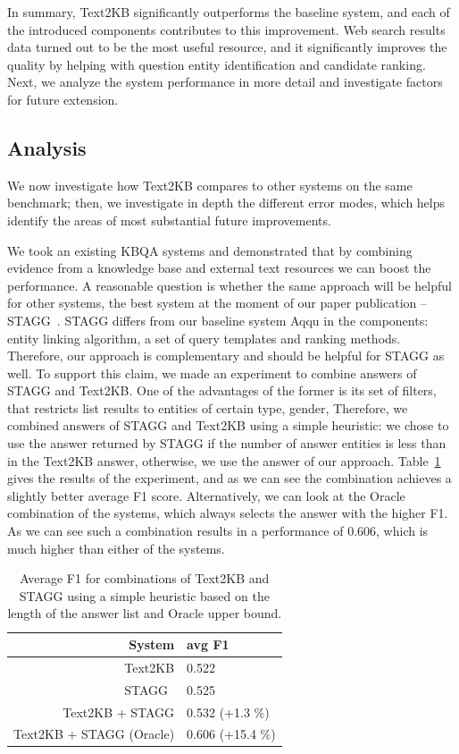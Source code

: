 In summary, Text2KB significantly outperforms the baseline system, and each of the introduced components contributes to this improvement.
Web search results data turned out to be the most useful resource, and it significantly improves the quality by helping with question entity identification and candidate ranking.
Next, we analyze the system performance in more detail and investigate factors for future extension.

\subsection{Analysis}
\label{section:factoid:approaches:text2kb:analysis}

We now investigate how Text2KB compares to other systems on the same benchmark; then, we investigate in depth the different error modes, which helps identify the areas of most substantial future improvements.

We took an existing KBQA systems and demonstrated that by combining evidence from a knowledge base and external text resources we can boost the performance.
A reasonable question is whether the same approach will be helpful for other systems, \eg the best system at the moment of our paper publication -- STAGG~\cite{yih:ACL:2015:STAGG}.
STAGG differs from our baseline system Aqqu in the components: entity linking algorithm, a set of query templates and ranking methods.
Therefore, our approach is complementary and should be helpful for STAGG as well.
To support this claim, we made an experiment to combine answers of STAGG and Text2KB.
One of the advantages of the former is its set of filters, that restricts list results to entities of certain type, gender, \etc
Therefore, we combined answers of STAGG and Text2KB using a simple heuristic: we chose to use the answer returned by STAGG if the number of answer entities is less than in the Text2KB answer, otherwise, we use the answer of our approach.
Table~\ref{table:factoid:text2kb:combine_stagg} gives the results of the experiment, and as we can see the combination achieves a slightly better average F1 score.
Alternatively, we can look at the Oracle combination of the systems, which always selects the answer with the higher F1.
As we can see such a combination results in a performance of 0.606, which is much higher than either of the systems.

\begin{table}
\centering
\begin{tabular}{rl}
System  & avg F1 \\
\hline
Text2KB & 0.522\\
STAGG~\cite{yih:ACL:2015:STAGG} & 0.525\\
Text2KB + STAGG & 0.532 (+1.3 \%) \\
Text2KB + STAGG (Oracle) & 0.606 (+15.4 \%) \\
\end{tabular}
\caption{Average F1 for combinations of Text2KB and STAGG using a simple heuristic based on the length of the answer list and Oracle upper bound.}
\label{table:factoid:text2kb:combine_stagg}
\end{table}

